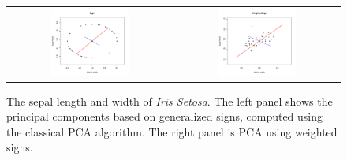 \documentclass[ss]{imsart}
\theoremstyle{Example}
\begin{document}
 \begin{figure}
\begin{center}
\begin{tabular}{cc}
\includegraphics[width=0.49\textwidth]{./RobustPCA_Figures/Iris_Sepal_PCA_Out_Sign} &
\includegraphics[width=0.49\textwidth]{./RobustPCA_Figures/Iris_Sepal_PCA_Out_WSign} 
\end{tabular}
\end{center}
\caption{The sepal length and width of \textit{Iris Setosa}. The left panel shows the principal components based on generalized signs, computed using the classical PCA algorithm. The right panel is PCA using weighted signs. }
\label{Figure:Sign_PCA}
\end{figure}
\end{document}
